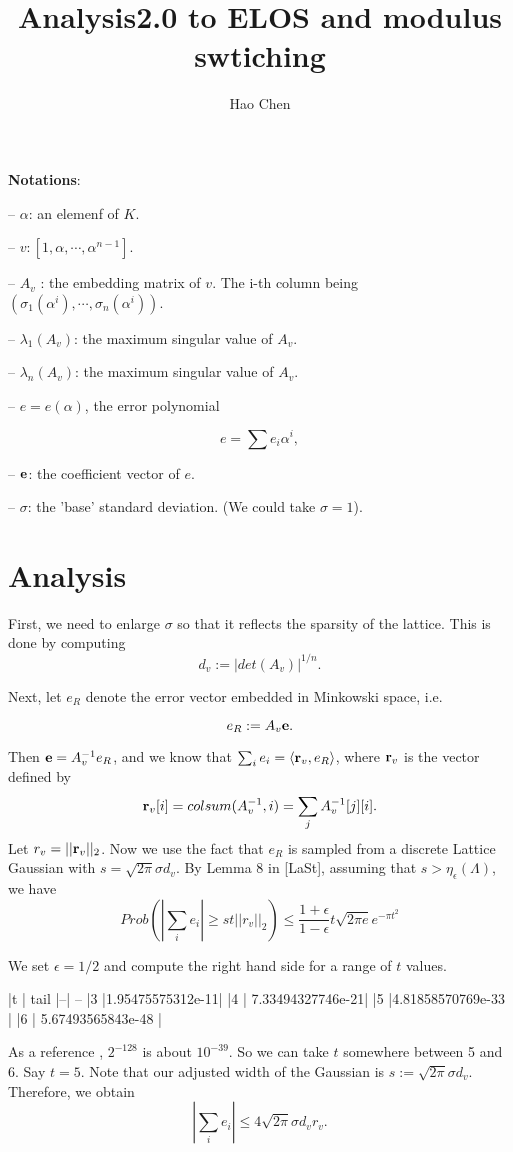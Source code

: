 \documentclass{amsart}
\title{Analysis2.0 to ELOS and modulus swtiching}
\author{Hao Chen}
\begin{document}
\maketitle

{\bf Notations}:

-- $\alpha$: an elemenf of $K$.

-- $v : [1, \alpha, \cdots, \alpha^{n-1}]$.

-- $A_v$ : the embedding matrix of $v$. The i-th column being $(\sigma_1(\alpha^i), \cdots, \sigma_n(\alpha^i))$.

-- $\lambda_1(A_v)$: the maximum singular value of $A_v$.

-- $\lambda_n(A_v)$: the maximum singular value of $A_v$.

-- $e = e(\alpha)$, the error polynomial

$$e = \sum e_i \alpha^i,$$

-- ${\bf e}$: the coefficient vector of $e$.

-- $\sigma$: the 'base' standard deviation. (We could take $\sigma = 1$).


\section{Analysis}

First, we need to enlarge $\sigma$ so that it reflects the sparsity of the lattice. This is done by computing
\[
    d_v := |det(A_v)|^{1/n}.
\]

Next, let $e_R$ denote the error vector embedded in Minkowski space, i.e.

\[
e_R :=  A_v {\bf e}.
\]

Then ${\bf e} = A_v^{-1}e_R$, and we know that $\sum_i e_i = \langle {\bf r}_v, e_R \rangle$, where ${\bf r}_v$ is the vector defined by
\[
    {\bf r}_v[i] = colsum(A_v^{-1},i) = \sum_j A_v^{-1}[j][i].
\]
Let $r_v = ||{\bf r}_v||_2$. Now we use the fact that $e_R$ is sampled from a discrete Lattice Gaussian with $s = \sqrt{2\pi} \sigma d_v$. By Lemma 8 in [LaSt], assuming that $s > \eta_\epsilon(\Lambda)$, we have
\[
Prob(|\sum_i e_i| \geq st||r_v||_2) \leq \frac{1+\epsilon}{1-\epsilon} t\sqrt{2\pi e}e^{-\pi t^2}
\]

We set $\epsilon = 1/2$ and compute the right hand side
for a range of $t$ values.

|t | tail
|--| --
|3 |1.95475575312e-11|
|4 | 7.33494327746e-21|
|5 |4.81858570769e-33  |
|6 | 5.67493565843e-48 |

As a reference , $2^{-128}$ is about $10^{-39}$. So we can take $t$ somewhere between 5 and 6. Say $t = 5$. Note that
our adjusted width of the Gaussian is $s := \sqrt{2\pi} \sigma d_v$. Therefore, we obtain
\[
   |\sum_i e_i| \leq 4\sqrt{2\pi} \sigma d_v r_v.
\]
\end{document}

